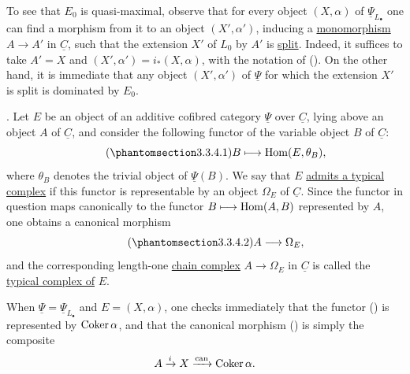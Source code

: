 To see that $E_0$ is quasi-maximal, observe that for every object
$(X,\alpha)$ of $\underline\Psi_{L_\bullet}$ one can find a morphism
from it to an object $(X',\alpha')$, inducing a
\underline{monomorphism} $A\longrightarrow A'$ in $\underline C$,
such that the extension $X'$ of $L_0$ by $A'$ is \underline{split}.
Indeed, it suffices to take $A'=X$ and
$(X',\alpha')=i_*(X,\alpha)$, with the notation of (). On the
other hand, it is immediate that any object $(X',\alpha')$ of
$\underline\Psi$ for which the extension $X'$ is split is dominated
by $E_0$.

. Let $E$ be an object of an additive cofibred category
$\underline\Psi$ over $\underline C$, lying above an object $A$ of
$\underline C$, and consider the following functor of the variable
object $B$ of $\underline C$:
\begin{equation}\tag{\SGARefTarget{sga7.sga7i.evii.n3-3-4-1}{3.3.4.1}}
 B\longmapsto\Hom(E,\theta_B),
\end{equation}
where $\theta_B$ denotes the trivial object of $\underline\Psi(B)$.
We say that $E$ \underline{admits a typical complex} if this functor
is representable by an object $\Omega_E$ of $\underline C$. Since
the functor in question maps canonically to the functor
$B\longmapsto\operatorname{Hom}(A,B)$ represented by $A$, one obtains a canonical
morphism
\begin{equation}\tag{\SGARefTarget{sga7.sga7i.evii.n3-3-4-2}{3.3.4.2}}
 A\longrightarrow\Omega_E,
\end{equation}
and the corresponding length-one \underline{chain complex}
$A\longrightarrow\Omega_E$ in $\underline C$ is called the
\underline{typical complex of} $E$.

When $\underline\Psi=\underline\Psi_{L_\bullet}$ and
$E=(X,\alpha)$, one checks immediately that the functor () is
represented by $\operatorname{Coker}\alpha$, and that the canonical morphism
() is simply the composite
\[
 A\xrightarrow{i}X\xrightarrow{\mathrm{can}}\operatorname{Coker}\alpha.
\]

